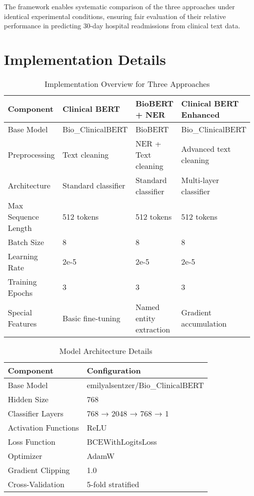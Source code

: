 \documentclass[11pt,a4paper]{article}
\begin{document}
The framework enables systematic comparison of the three approaches under identical experimental conditions, ensuring fair evaluation of their relative performance in predicting 30-day hospital readmissions from clinical text data.

\section{Implementation Details}

\begin{table}[H]
\centering
\caption{Implementation Overview for Three Approaches}
\begin{tabular}{@{}llll@{}}
\toprule
\textbf{Component} & \textbf{Clinical BERT} & \textbf{BioBERT + NER} & \textbf{Clinical BERT Enhanced} \\
\midrule
Base Model & Bio\_ClinicalBERT & BioBERT & Bio\_ClinicalBERT \\
Preprocessing & Text cleaning & NER + Text cleaning & Advanced text cleaning \\
Architecture & Standard classifier & Standard classifier & Multi-layer classifier \\
Max Sequence Length & 512 tokens & 512 tokens & 512 tokens \\
Batch Size & 8 & 8 & 8 \\
Learning Rate & 2e-5 & 2e-5 & 2e-5 \\
Training Epochs & 3 & 3 & 3 \\
Special Features & Basic fine-tuning & Named entity extraction & Gradient accumulation \\
\bottomrule
\end{tabular}
\end{table}

\begin{table}[H]
\centering
\caption{Model Architecture Details}
\begin{tabular}{@{}ll@{}}
\toprule
\textbf{Component} & \textbf{Configuration} \\
\midrule
Base Model & emilyalsentzer/Bio\_ClinicalBERT \\
Hidden Size & 768 \\
Classifier Layers & 768 → 2048 → 768 → 1 \\
Activation Functions & ReLU \\
Loss Function & BCEWithLogitsLoss \\
Optimizer & AdamW \\
Gradient Clipping & 1.0 \\
Cross-Validation & 5-fold stratified \\
\bottomrule
\end{tabular}
\end{table}
\end{document}
